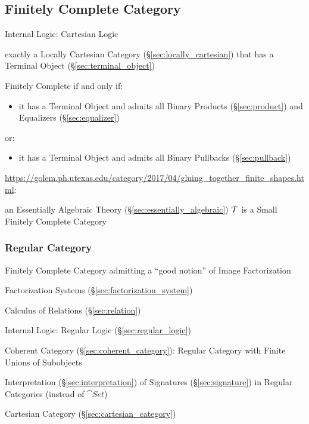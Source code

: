 \subsection{Finitely Complete Category}\label{sec:finitely_complete}

Internal Logic: Cartesian Logic %

exactly a Locally Cartesian Category (\S\ref{sec:locally_cartesian})
that has a Terminal Object (\S\ref{sec:terminal_object})

Finitely Complete if and only if:
\begin{itemize}
  \item it has a Terminal Object and admits all Binary Products
    (\S\ref{sec:product}) and Equalizers (\S\ref{sec:equalizer})
\end{itemize}
or:
\begin{itemize}
  \item it has a Terminal Object and admits all Binary Pullbacks
    (\S\ref{sec:pullback})
\end{itemize}

\url{https://golem.ph.utexas.edu/category/2017/04/gluing_together_finite_shapes.html}:

an Essentially Algebraic Theory (\S\ref{sec:essentially_algebraic})
$\mathcal{T}$ is a Small Finitely Complete Category



\subsubsection{Regular Category}\label{sec:regular_category}

Finitely Complete Category admitting a ``good notion'' of Image
Factorization

\fist Factorization Systems (\S\ref{sec:factorization_system})

Calculus of Relations (\S\ref{sec:relation})

Internal Logic: Regular Logic (\S\ref{sec:regular_logic})

Coherent Category (\S\ref{sec:coherent_category}): Regular Category
with Finite Unions of Subobjects

Interpretation (\S\ref{sec:interpretation}) of Signatures
(\S\ref{sec:signature}) in Regular Categories (instead of $\cat{Set}$)

Cartesian Category (\S\ref{sec:cartesian_category})

